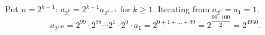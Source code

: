 Put $n=2^{k-1}$: $a_{2^k}=2^{k-1}a_{2^{k-1}}$ for $k\ge1$. Iterating from $a_{2^0}=a_1=1$,
\[
a_{2^{100}}=2^{99}\cdot2^{98}\cdots2^{1}\cdot2^{0}\cdot a_1=2^{0+1+\dots+99}=2^{\dfrac{99\cdot100}{2}}=\boxed{2^{4950}}.
\]
